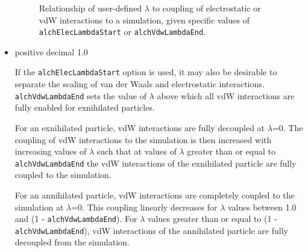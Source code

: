 \begin{itemize}
\begin{figure}
  \caption{Relationship of user-defined $\lambda$ to coupling of electrostatic or vdW interactions to a simulation, given specific values of {\tt alchElecLambdaStart} or {\tt alchVdwLambdaEnd}.}
  \label{fig:softcore}
\end{figure}

\item
{positive decimal}
{1.0} %
{If the {\tt alchElecLambdaStart} option is used, it may also be 
desirable to separate the scaling of van der Waals and electrostatic
interactions. {\tt alchVdwLambdaEnd} sets the value of $\lambda$ above which
all vdW interactions are fully enabled for exnihilated particles.

For an exnihilated particle, vdW interactions are fully decoupled at $\lambda$=0.  The coupling of vdW interactions to the simulation is then increased with increasing values of $\lambda$ such that at values of $\lambda$ greater than or equal to {\tt alchVdwLambdaEnd} the vdW interactions of the exnihilated particle are fully coupled to the simulation.

For an annihilated particle, vdW interactions are completely coupled to the simulation at $\lambda$=0.  This coupling linearly decreases for $\lambda$ values between 1.0 and (1 - {\tt alchVdwLambdaEnd}).  For $\lambda$ values greater than or equal to (1 - {\tt alchVdwLambdaEnd}), vdW interactions of the annihilated particle are fully decoupled from the simulation.  
}






\end{itemize}
